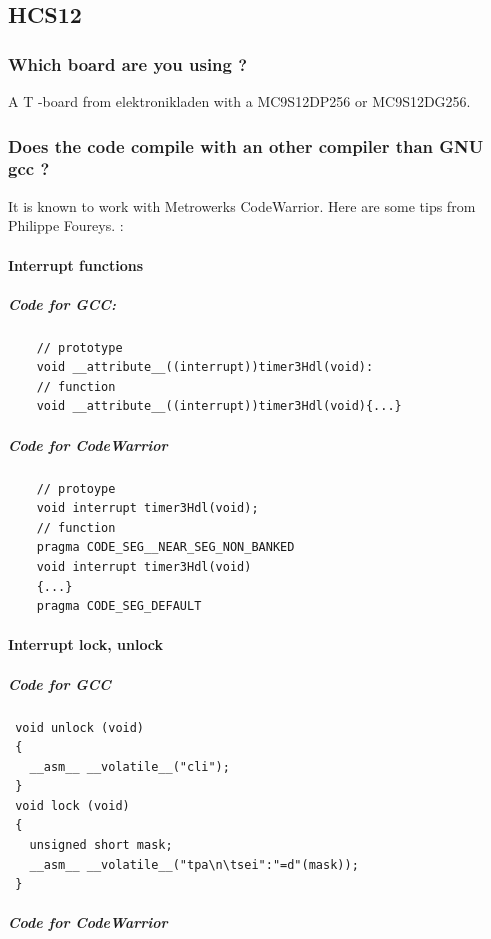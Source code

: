 \documentclass[12pt,english,a4paper]{book}
\begin{document}
\subsection{HCS12}


\subsubsection{Which board are you using ?}

A T -board from elektronikladen with a MC9S12DP256 or MC9S12DG256.


\subsubsection{Does the code compile with an other compiler than GNU gcc ?}

It is known to work with Metrowerks CodeWarrior. Here are some tips
from Philippe Foureys. :


\paragraph{Interrupt functions}


\subparagraph{Code for GCC:
}


\begin{verbatim}
	// prototype
	void __attribute__((interrupt))timer3Hdl(void):
	// function
	void __attribute__((interrupt))timer3Hdl(void){...}
\end{verbatim}

	
\subparagraph{Code for CodeWarrior
}


\begin{verbatim}
	// protoype
	void interrupt timer3Hdl(void);
	// function
	pragma CODE_SEG__NEAR_SEG_NON_BANKED
	void interrupt timer3Hdl(void)
	{...}
	pragma CODE_SEG_DEFAULT\end{verbatim}


\paragraph{Interrupt lock, unlock
}


\subparagraph{Code for GCC
}


\begin{verbatim}
 void unlock (void)
 {
   __asm__ __volatile__("cli");
 }
 void lock (void)
 {
   unsigned short mask;
   __asm__ __volatile__("tpa\n\tsei":"=d"(mask));
 }
\end{verbatim}


\subparagraph{Code for CodeWarrior}
\end{document}
